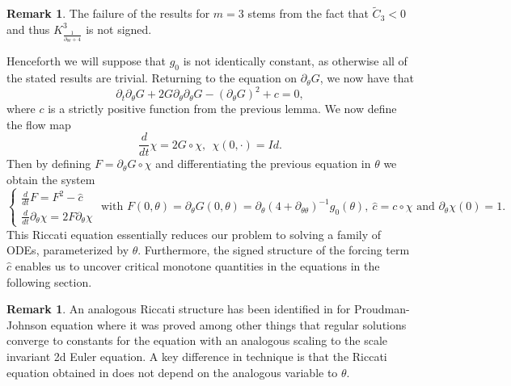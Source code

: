 \documentclass[10pt]{article}
\numberwithin{equation}{section}
\theoremstyle{plain}
\theoremstyle{definition}
\newtheorem{remark}[lemma]{Remark}
\numberwithin{equation}{section}
\begin{document}
\begin{remark}
The failure of the results for $m=3$ stems from the fact that $\tilde{C}_3<0$ and thus $K^3_{\frac{1}{\partial_{\theta\theta}+4}}$ is not signed.
\end{remark}
Henceforth we will suppose that $g_0$ is not identically constant, as otherwise all of the stated results are trivial. Returning to the equation on $\partial_\theta G$, we now have that
\[
\partial_t \partial_\theta G+2G\partial_\theta \partial_\theta G-(\partial_\theta G)^2+c=0,
\]
where $c$ is a strictly positive function from the previous lemma. We now define the flow map
\[
\frac{d}{dt}\chi=2G\circ \chi, \ \  \chi(0,\cdot)=Id.
\]
Then by defining $F=\partial_\theta G\circ \chi$ and differentiating the previous equation in $\theta$ we obtain the system 
\begin{equation}\label{eqn:riccati-euler}
\begin{cases}
\frac{d}{dt}F=F^2-\hat c\\
\frac{d}{dt}\partial_\theta \chi=2F \partial_\theta \chi
\end{cases} \text{ with } F(0,\theta)=\partial_\theta G(0,\theta)=\partial_\theta(4+\partial_{\theta \theta})^{-1} g_0(\theta),\ \hat c=c\circ \chi \text{ and } \partial_\theta \chi(0)=1.
\end{equation}
This Riccati equation essentially reduces our problem to solving a family of ODEs, parameterized by $\theta$. Furthermore, the signed structure of the forcing term $\hat c$ enables us to uncover critical monotone quantities in the equations in the following section.
\begin{remark}
An analogous Riccati structure has been identified in \cite{SarriaSaxton} for Proudman-Johnson equation where it was proved among other things that regular solutions converge to constants for the equation with an analogous scaling to the scale invariant 2d Euler equation. A key difference in technique is that the Riccati equation obtained in \cite{SarriaSaxton} does not depend on the analogous variable to $\theta$.
\end{remark}
\end{document}
